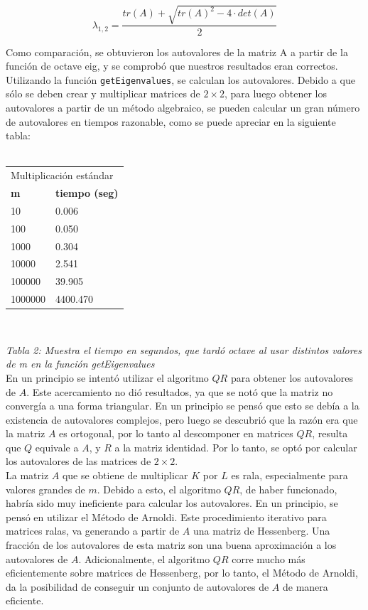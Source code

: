 \documentclass[a4paper,11pt]{article}
\begin{document}
\begin{equation}
    \lambda_{1,2} = \frac{tr(A) + \sqrt{tr(A)^2 - 4 \cdot det(A)}}{2}
\end{equation}

Como comparación, se obtuvieron los autovalores de la matriz A a partir de la función de octave eig,
y se comprobó que nuestros resultados eran correctos.\\

Utilizando la función \verb+getEigenvalues+, se calculan los autovalores. Debido a que
sólo se deben crear y multiplicar matrices de $2 \times 2$, para luego obtener los
autovalores a partir de un método algebraico, se pueden calcular un gran número
de autovalores en tiempos razonable, como se puede apreciar en la siguiente tabla:\\ \\
{\centering
\begin{tabular}{|l||l|}
\hline
\multicolumn{2}{|l|}{Multiplicaci\'on est\'andar}\\
\cline{1-2}
\textbf{m}&\textbf{tiempo (seg)}\\
\hline\hline
10 & 0.006 \\
100 & 0.050\\
1000 & 0.304\\
10000 & 2.541\\
100000 & 39.905\\
1000000 & 4400.470\\
\hline
\end{tabular}\\[10pt]
}
\small\emph{Tabla 2: Muestra el tiempo en segundos, que tardó octave al usar distintos valores de m en la función getEigenvalues}\\

En un principio se intentó utilizar el algoritmo $QR$ para obtener los
autovalores de $A$. Este acercamiento no di\'o resultados, ya que se not\'o que la
matriz no converg\'ia a una forma triangular. En un principio se pens\'o que esto
se deb\'ia a la existencia de autovalores complejos, pero luego se descubri\'o que
la raz\'on era que la matriz $A$ es ortogonal, por lo tanto al descomponer en
matrices $QR$, resulta que $Q$ equivale a $A$, y $R$ a la matriz identidad. Por lo tanto, se opt\'o por
calcular los autovalores de las matrices de $2 \times 2$.\\

La matriz $A$ que se obtiene de multiplicar $K$ por $L$ es rala, especialmente para
valores grandes de $m$. Debido a esto, el algoritmo $QR$, de haber funcionado,
habr\'ia sido muy ineficiente para calcular los autovalores. En un principio, se
pens\'o en utilizar el M\'etodo de Arnoldi. Este procedimiento iterativo para
matrices ralas, va generando a partir de $A$ una matriz de Hessenberg. Una
fracci\'on de los autovalores de esta matriz son una buena aproximaci\'on a los
autovalores de $A$. Adicionalmente, el algoritmo $QR$ corre mucho m\'as
eficientemente sobre matrices de Hessenberg, por lo tanto, el M\'etodo de
Arnoldi, da la posibilidad de conseguir un conjunto de autovalores de $A$ de
manera eficiente. \\
\end{document}
